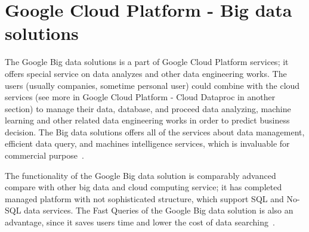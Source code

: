 \section{Google Cloud Platform - Big data solutions}

The Google Big data solutions is a part of Google Cloud Platform services; it offers special service on data analyzes and other data engineering works. The users (usually companies, sometime personal user) could combine with the cloud services (see more in Google Cloud Platform - Cloud Dataproc in another section) to manage their data, database, and proceed data analyzing, machine learning and other related data engineering works in order to predict business decision. The Big data solutions offers all of the services about data management, efficient data query, and machines intelligence services, which is invaluable for commercial purpose~\cite{GoogleCP_BDS}.

The functionality of the Google Big data solution is comparably advanced compare with other big data and cloud computing service; it has completed managed platform with not sophisticated structure, which support SQL and No-SQL data services. The Fast Queries of the Google Big data solution is also an advantage, since it saves users time and lower the cost of data searching~\cite{GoogleCP_BDS}. 
